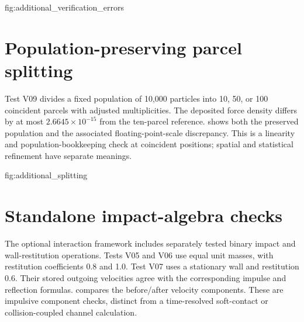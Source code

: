 {fig:additional_verification_errors}
\FloatBarrier

\section{Population-preserving parcel splitting}
Test V09 divides a fixed population of 10,000 particles into 10, 50, or
100 coincident parcels with adjusted multiplicities. The deposited force
density differs by at most $2.6645\times10^{-15}$ from the ten-parcel
reference.  shows both the preserved
population and the associated floating-point-scale discrepancy.
This is a linearity and population-bookkeeping check at coincident
positions; spatial and statistical refinement have separate meanings.

{fig:additional_splitting}
\FloatBarrier

\section{Standalone impact-algebra checks}
The optional interaction framework includes separately tested binary
impact and wall-restitution operations. Tests V05 and V06 use equal
unit masses, with restitution coefficients 0.8 and 1.0. Test V07 uses
a stationary wall and restitution 0.6. Their stored outgoing velocities
agree with the corresponding impulse and reflection formulas.
 compares the before/after velocity components.
These are impulsive component checks, distinct from a time-resolved
soft-contact or collision-coupled channel calculation.

